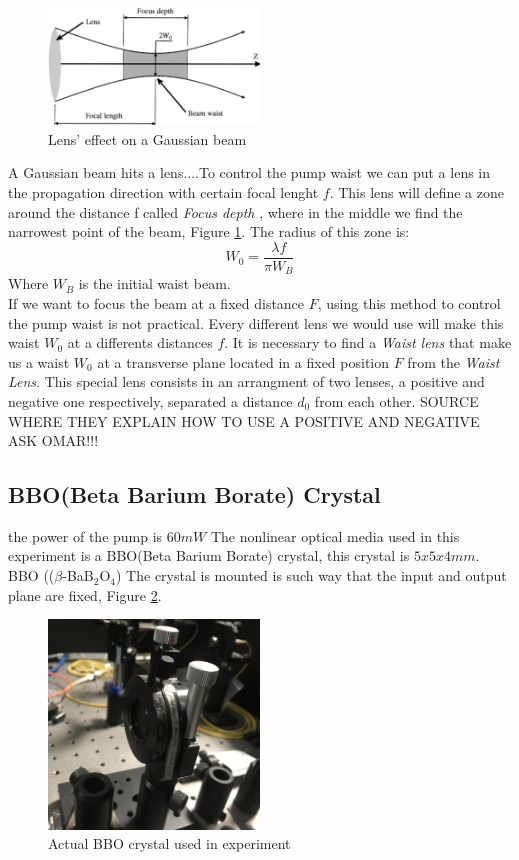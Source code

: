 \begin{figure}
\centering
\includegraphics[width=0.5\textwidth]{Figures/waist.png}
\caption{Lens' effect on a Gaussian beam} 
\label{fig:waist}
\end{figure}
A Gaussian beam hits a lens....To control the pump waist we can put a lens in the propagation direction with certain focal lenght $f$. This lens will define a zone around
the distance f called \textit{Focus depth}\cite{hecht} , where in the middle we find the narrowest point of the beam, Figure \ref{fig:waist}.
The radius of this zone is:
\begin{equation}
 W_0=\frac{\lambda f}{\pi W_B}
\end{equation}
Where $W_B$ is the initial waist beam. 
\\
If we want to focus the beam at a fixed distance $F$, using this method to control the pump waist is not practical. 
Every different lens we would use will make this waist $W_0$ at a differents distances $f$. It is necessary to find a \textit{Waist lens}
that make us a waist $W_0$ at a transverse plane located in a fixed position $F$ from the \textit{Waist Lens}. This
special lens consists in an arrangment of two lenses, a positive and negative one respectively, separated a distance 
$d_0$ from each other.
SOURCE WHERE THEY EXPLAIN HOW TO USE A POSITIVE AND NEGATIVE ASK OMAR!!!


\subsection{BBO(Beta Barium Borate) Crystal}

the power of the pump is $60mW$
The nonlinear optical media used in this experiment is a BBO(Beta Barium Borate) crystal, this crystal is $5x5x4 mm$.
BBO (($\beta$-BaB$_{2}$O$_4$)
The crystal is mounted is such way that the input and output plane are fixed, Figure \ref{fig:bbo}.
\begin{figure}
\centering
\includegraphics[width=0.5\textwidth]{Figures/bbo.jpg}
\caption{Actual BBO crystal used in experiment} 
\label{fig:bbo}
\end{figure}
 




